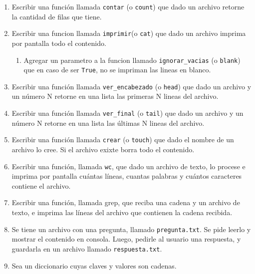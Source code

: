 \documentclass[
  letterpaper,
  DIV=11,
  numbers=noendperiod]{scrreprt}
\providecommand{\tightlist}{%
  \setlength{\itemsep}{0pt}\setlength{\parskip}{0pt}}\usepackage{longtable,booktabs,array}
\begin{document}
\begin{enumerate}
\def\labelenumi{\arabic{enumi}.}
\item
  Escribir una función llamada \texttt{contar} (o \texttt{count}) que
  dado un archivo retorne la cantidad de filas que tiene.
\item
  Escribir una funcion llamada \texttt{imprimir}(o \texttt{cat}) que
  dado un archivo imprima por pantalla todo el contenido.

  \begin{enumerate}
  \def\labelenumii{\alph{enumii}.}
  \tightlist
  \item
    Agregar un parametro a la funcion llamado \texttt{ignorar\_vacias}
    (o \texttt{blank}) que en caso de ser \texttt{True}, no se impriman
    las lineas en blanco.
  \end{enumerate}
\item
  Escribir una función llamada \texttt{ver\_encabezado} (o
  \texttt{head}) que dado un archivo y un número N retorne en una lista
  las primeras N lineas del archivo.
\item
  Escribir una función llamada \texttt{ver\_final} (o \texttt{tail}) que
  dado un archivo y un número N retorne en una lista las últimas N
  lineas del archivo.
\item
  Escribir una función llamada \texttt{crear} (o \texttt{touch}) que
  dado el nombre de un archivo lo cree. Si el archivo exixte borra todo
  el contenido.
\item
  Escribir una función, llamada \texttt{wc}, que dado un archivo de
  texto, lo procese e imprima por pantalla cuántas líneas, cuantas
  palabras y cuántos caracteres contiene el archivo.
\item
  Escribir una función, llamada grep, que reciba una cadena y un archivo
  de texto, e imprima las líneas del archivo que contienen la cadena
  recibida.
\item
  Se tiene un archivo con una pregunta, llamado \texttt{pregunta.txt}.
  Se pide leerlo y mostrar el contenido en consola. Luego, pedirle al
  usuario una respuesta, y guardarla en un archivo llamado
  \texttt{respuesta.txt}.
\item
  Sea un diccionario cuyas claves y valores son cadenas.


\end{enumerate}
\end{document}
